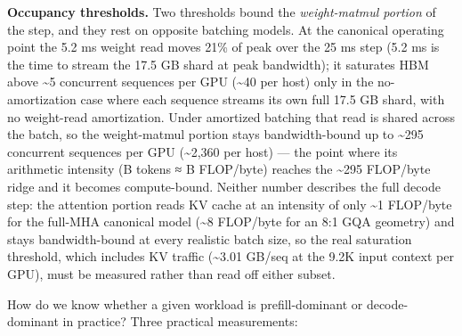 \textbf{Occupancy thresholds.} Two thresholds bound the
\emph{weight-matmul portion} of the step, and they rest on opposite
batching models. At the canonical operating point the 5.2 ms weight read
moves 21\% of peak over the 25 ms step (5.2 ms is the time to stream the
17.5 GB shard at peak bandwidth); it saturates HBM above
\textasciitilde5 concurrent sequences per GPU (\textasciitilde40 per
host) only in the no-amortization case where each sequence streams its
own full 17.5 GB shard, with no weight-read amortization. Under
amortized batching that read is shared across the batch, so the
weight-matmul portion stays bandwidth-bound up to \textasciitilde295
concurrent sequences per GPU (\textasciitilde2,360 per host) --- the
point where its arithmetic intensity (B tokens ≈ B FLOP/byte) reaches
the \textasciitilde295 FLOP/byte ridge and it becomes compute-bound.
Neither number describes the full decode step: the attention portion
reads KV cache at an intensity of only \textasciitilde1 FLOP/byte for
the full-MHA canonical model (\textasciitilde8 FLOP/byte for an 8:1 GQA
geometry) and stays bandwidth-bound at every realistic batch size, so
the real saturation threshold, which includes KV traffic
(\textasciitilde3.01 GB/seq at the 9.2K input context per GPU), must be
measured rather than read off either subset.

\label{measurement}


How do we know whether a given workload is prefill-dominant or
decode-dominant in practice? Three practical measurements:

